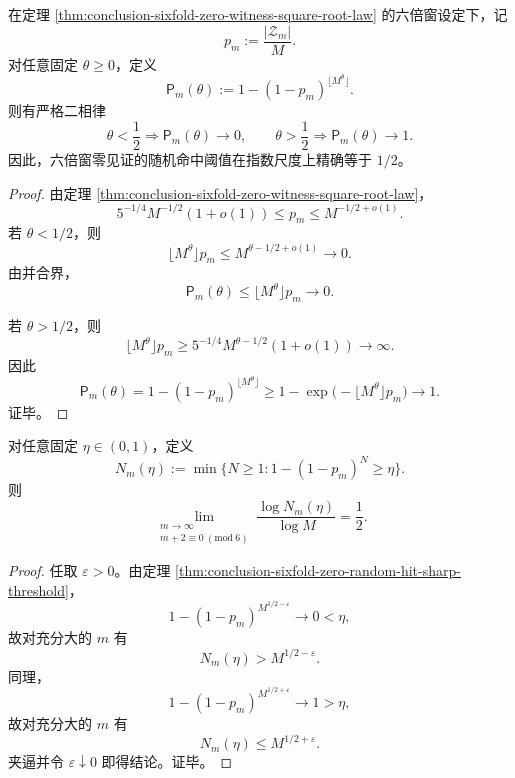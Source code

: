 \begin{theorem}[六倍窗零见证随机命中的精确指数阈值]\label{thm:conclusion-sixfold-zero-random-hit-sharp-threshold}
在定理 \ref{thm:conclusion-sixfold-zero-witness-square-root-law} 的六倍窗设定下，记
\[
p_m:=\frac{|\mathcal Z_m|}{M}.
\]
对任意固定 \(\theta\ge 0\)，定义
\[
\mathsf P_m(\theta):=1-(1-p_m)^{\lfloor M^\theta\rfloor}.
\]
则有严格二相律
\[
\theta<\frac12 \Longrightarrow \mathsf P_m(\theta)\to 0,
\qquad
\theta>\frac12 \Longrightarrow \mathsf P_m(\theta)\to 1.
\]
因此，六倍窗零见证的随机命中阈值在指数尺度上精确等于 \(1/2\)。
\end{theorem}

\begin{proof}
由定理 \ref{thm:conclusion-sixfold-zero-witness-square-root-law}，
\[
5^{-1/4}M^{-1/2}(1+o(1))\le p_m\le M^{-1/2+o(1)}.
\]
若 \(\theta<1/2\)，则
\[
\lfloor M^\theta\rfloor p_m\le M^{\theta-1/2+o(1)}\to 0.
\]
由并合界，
\[
\mathsf P_m(\theta)\le \lfloor M^\theta\rfloor p_m\to 0.
\]

若 \(\theta>1/2\)，则
\[
\lfloor M^\theta\rfloor p_m\ge 5^{-1/4}M^{\theta-1/2}(1+o(1))\to \infty.
\]
因此
\[
\mathsf P_m(\theta)
=1-(1-p_m)^{\lfloor M^\theta\rfloor}
\ge 1-\exp\!\bigl(-\lfloor M^\theta\rfloor p_m\bigr)\to 1.
\]
证毕。
\end{proof}

\begin{corollary}[固定置信度的最小抽样复杂度为半速率阶]\label{cor:conclusion-sixfold-zero-fixed-confidence-sample-complexity}
对任意固定 \(\eta\in(0,1)\)，定义
\[
N_m(\eta):=\min\{N\ge 1:1-(1-p_m)^N\ge \eta\}.
\]
则
\[
\lim_{\substack{m\to\infty\\ m+2\equiv 0\ (\mathrm{mod}\ 6)}}
\frac{\log N_m(\eta)}{\log M}
=
\frac12.
\]
\end{corollary}

\begin{proof}
任取 \(\varepsilon>0\)。由定理 \ref{thm:conclusion-sixfold-zero-random-hit-sharp-threshold}，
\[
1-(1-p_m)^{M^{1/2-\varepsilon}}\to 0<\eta,
\]
故对充分大的 \(m\) 有
\[
N_m(\eta)>M^{1/2-\varepsilon}.
\]
同理，
\[
1-(1-p_m)^{M^{1/2+\varepsilon}}\to 1>\eta,
\]
故对充分大的 \(m\) 有
\[
N_m(\eta)\le M^{1/2+\varepsilon}.
\]
夹逼并令 \(\varepsilon\downarrow 0\) 即得结论。证毕。
\end{proof}

